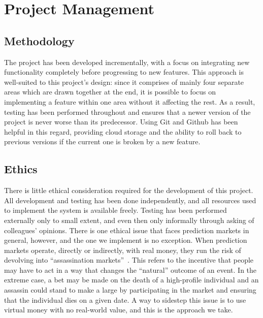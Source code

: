 \documentclass[10pt,a4paper]{article}
\theoremstyle{plain}
\theoremstyle{definition}
\begin{document}
\section{Project Management}

\label{sec:projectManagement}

\subsection{Methodology}

The project has been developed incrementally, with a focus on integrating new
functionality completely before progressing to new features. This approach is
well-suited to this project's design: since it comprises of mainly four
separate areas which are drawn together at the end, it is possible to focus on
implementing a feature within one area without it affecting the rest. As a
result, testing has been performed throughout and ensures that a newer version
of the project is never worse than its predecessor. Using Git and Github has
been helpful in this regard, providing cloud storage and the ability to roll
back to previous versions if the current one is broken by a new feature.

\subsection{Ethics}

There is little ethical consideration required for the development of this
project. All development and testing has been done independently, and all
resources used to implement the system is available freely. Testing has been
performed externally only to small extent, and even then only informally
through asking of colleagues' opinions. There is one ethical issue that faces
prediction markets in general, however, and the one we implement is no
exception. When prediction markets operate, directly or indirectly, with real
money, they run the risk of devolving into ``assassination
markets''~\cite{assassinationMarkets, crowdfundingMurder}. This refers to the
incentive that people may have to act in a way that changes the ``natural''
outcome of an event. In the extreme case, a bet may be made on the death of a
high-profile individual and an assassin could stand to make a large by
participating in the market and ensuring that the individual dies on a given
date. A way to sidestep this issue is to use virtual money with no real-world
value, and this is the approach we take.
\end{document}
